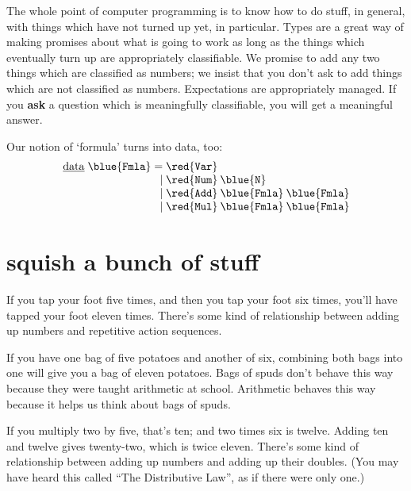 \documentclass{book}
\newcommand{\D}[1]{\blue{\mathtt{#1}}}
\newcommand{\C}[1]{\red{\mathtt{#1}}}
\newcommand{\K}[1]{\underline{\mathrm{#1}}}
\begin{document}
The whole point of computer programming is to know how to do stuff, in general, with things which have not turned up yet, in particular. Types are a great way of making promises about what is going to work as long as the things which eventually turn up are appropriately classifiable. We promise to add any two things which are classified as numbers; we insist that you don't ask to add things which are not classified as numbers. Expectations are appropriately managed. If you \textbf{ask} a question which is meaningfully classifiable, you will get a meaningful answer.

Our notion of `formula' turns into data, too:
\[\begin{array}{r@{\;}r@{\;}l}
\K{data}\;\D{Fmla}& = & \C{Var} \\
                  & | & \C{Num}\:\D{N} \\
                  & | & \C{Add}\:\D{Fmla}\:\D{Fmla}\\
                  & | & \C{Mul}\:\D{Fmla}\:\D{Fmla}\\
\end{array}\]







\chapter{squish a bunch of stuff}

If you tap your foot five times, and then you tap your foot six times, you'll have tapped your foot eleven times. There's some kind of relationship between adding up numbers and repetitive action sequences.

If you have one bag of five potatoes and another of six, combining both bags into one will give you a bag of eleven potatoes. Bags of spuds don't behave this way because they were taught arithmetic at school. Arithmetic behaves this way because it helps us think about bags of spuds.

If you multiply two by five, that's ten; and two times six is twelve. Adding ten and twelve gives twenty-two, which is twice eleven. There's some kind of relationship between adding up numbers and adding up their doubles. (You may have heard this called ``The Distributive Law'', as if there were only one.)
\end{document}
